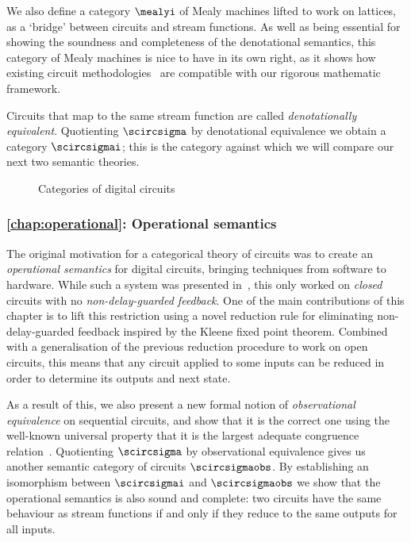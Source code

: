 We also define a category \(\mealyi\) of Mealy machines lifted to work on
lattices, as a `bridge' between circuits and stream functions.
As well as being essential for showing the soundness and completeness of the
denotational semantics, this category of Mealy machines is nice to have
in its own right, as it shows how existing circuit
methodologies~\cite{kohavi2009switching} are compatible with our rigorous
mathematic framework.

Circuits that map to the same stream function are called
\emph{denotationally equivalent}.
Quotienting \(\scircsigma\) by denotational equivalence we obtain a category
\(\scircsigmai\); this is the category against which we will compare our next
two semantic theories.


\begin{figure}
    \centering
    
    \caption{Categories of digital circuits}
    \label{fig:circuits-map}
\end{figure}

\subsubsection{\cref{chap:operational}: Operational semantics}

The original motivation for a categorical theory of circuits was to create an
\emph{operational semantics} for digital circuits, bringing techniques from
software to hardware.
While such a system was presented in~\cite{ghica2017diagrammatic}, this only
worked on \emph{closed} circuits with no \emph{non-delay-guarded feedback}.
One of the main contributions of this chapter is to lift this restriction using
a novel reduction rule for eliminating non-delay-guarded feedback inspired by
the Kleene fixed point theorem.
Combined with a generalisation of the previous reduction procedure to
work on open circuits, this means that any circuit applied to some inputs can be
reduced in order to determine its outputs and next state.

As a result of this, we also present a new formal notion of
\emph{observational equivalence} on sequential circuits, and show that it is the
correct one using the well-known universal property that it is the largest
adequate congruence relation~\cite{gordon1998operational}.
Quotienting \(\scircsigma\) by observational equivalence gives us another
semantic category of circuits \(\scircsigmaobs\).
By establishing an isomorphism between \(\scircsigmai\) and \(\scircsigmaobs\)
we show that the operational semantics is also sound and complete: two circuits
have the same behaviour as stream functions if and only if they reduce to the
same outputs for all inputs.

